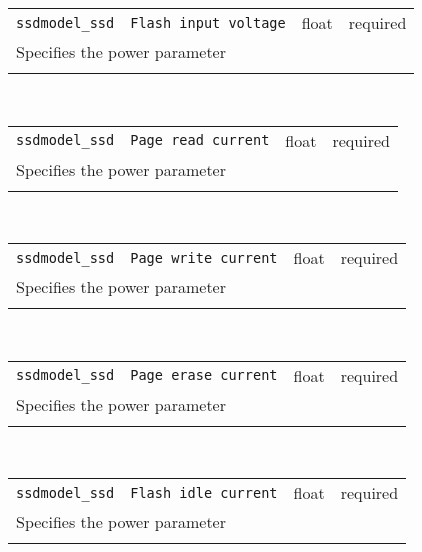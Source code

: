 \noindent 
\begin{tabular}{|p{\lpmodwidth}|p{\lpnamewidth}|p{0.5in}|p{0.5in}|}
\cline{1-4}
\texttt{ssdmodel\_ssd} & \texttt{Flash input voltage} & float & required \\ 
\cline{1-4}
\multicolumn{4}{|p{6in}|}{
Specifies the power parameter
}\\ 
\cline{1-4}
\multicolumn{4}{p{5in}}{}\\
\end{tabular}\\ 
\noindent 
\begin{tabular}{|p{\lpmodwidth}|p{\lpnamewidth}|p{0.5in}|p{0.5in}|}
\cline{1-4}
\texttt{ssdmodel\_ssd} & \texttt{Page read current} & float & required \\ 
\cline{1-4}
\multicolumn{4}{|p{6in}|}{
Specifies the power parameter
}\\ 
\cline{1-4}
\multicolumn{4}{p{5in}}{}\\
\end{tabular}\\ 
\noindent 
\begin{tabular}{|p{\lpmodwidth}|p{\lpnamewidth}|p{0.5in}|p{0.5in}|}
\cline{1-4}
\texttt{ssdmodel\_ssd} & \texttt{Page write current} & float & required \\ 
\cline{1-4}
\multicolumn{4}{|p{6in}|}{
Specifies the power parameter
}\\ 
\cline{1-4}
\multicolumn{4}{p{5in}}{}\\
\end{tabular}\\ 
\noindent 
\begin{tabular}{|p{\lpmodwidth}|p{\lpnamewidth}|p{0.5in}|p{0.5in}|}
\cline{1-4}
\texttt{ssdmodel\_ssd} & \texttt{Page erase current} & float & required \\ 
\cline{1-4}
\multicolumn{4}{|p{6in}|}{
Specifies the power parameter
}\\ 
\cline{1-4}
\multicolumn{4}{p{5in}}{}\\
\end{tabular}\\ 
\noindent 
\begin{tabular}{|p{\lpmodwidth}|p{\lpnamewidth}|p{0.5in}|p{0.5in}|}
\cline{1-4}
\texttt{ssdmodel\_ssd} & \texttt{Flash idle current} & float & required \\ 
\cline{1-4}
\multicolumn{4}{|p{6in}|}{
Specifies the power parameter
}\\ 
\cline{1-4}
\multicolumn{4}{p{5in}}{}\\
\end{tabular}\\ 
